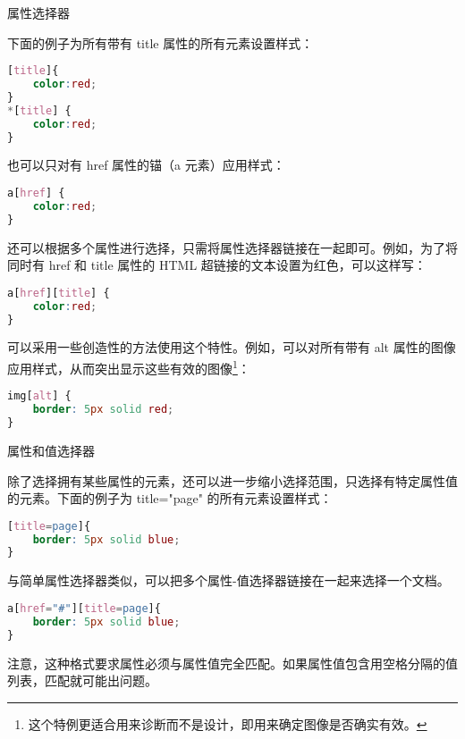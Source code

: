 \begin{compactitem}
\item 属性选择器



下面的例子为所有带有 title 属性的所有元素设置样式：

\begin{lstlisting}[language=CSS]
[title]{
	color:red;
}
*[title] {
	color:red;
}
\end{lstlisting}

也可以只对有 href 属性的锚（a 元素）应用样式：


\begin{lstlisting}[language=CSS]
a[href] {
	color:red;
}
\end{lstlisting}

还可以根据多个属性进行选择，只需将属性选择器链接在一起即可。例如，为了将同时有 href 和 title 属性的 HTML 超链接的文本设置为红色，可以这样写：

\begin{lstlisting}[language=CSS]
a[href][title] {
	color:red;
}
\end{lstlisting}


可以采用一些创造性的方法使用这个特性。例如，可以对所有带有 alt 属性的图像应用样式，从而突出显示这些有效的图像\footnote{这个特例更适合用来诊断而不是设计，即用来确定图像是否确实有效。}：

\begin{lstlisting}[language=CSS]
img[alt] {
	border: 5px solid red;
}
\end{lstlisting}




\item 属性和值选择器

除了选择拥有某些属性的元素，还可以进一步缩小选择范围，只选择有特定属性值的元素。下面的例子为 title="page" 的所有元素设置样式：

\begin{lstlisting}[language=CSS]
[title=page]{
	border: 5px solid blue;
}
\end{lstlisting}

与简单属性选择器类似，可以把多个属性-值选择器链接在一起来选择一个文档。

\begin{lstlisting}[language=CSS]
a[href="#"][title=page]{
	border: 5px solid blue;
}
\end{lstlisting}

注意，这种格式要求属性必须与属性值完全匹配。如果属性值包含用空格分隔的值列表，匹配就可能出问题。


\end{compactitem}
